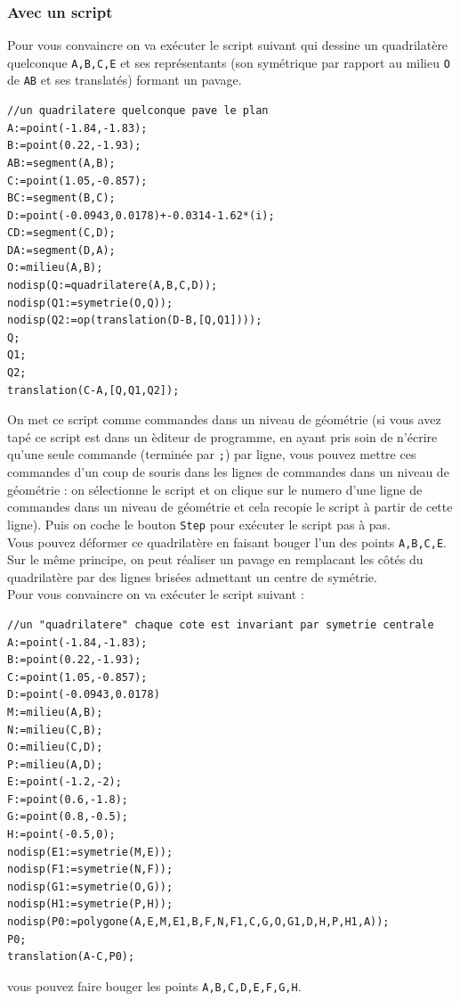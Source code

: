\documentclass[a4paper,11pt]{book}
\begin{document}
\subsubsection{Avec un script}
Pour vous convaincre on va ex\'ecuter le script suivant qui dessine un quadrilat\`ere quelconque {\tt A,B,C,E} et ses repr\'esentants 
 (son sym\'etrique par rapport au milieu {\tt O} de {\tt AB} et ses 
translat\'es) formant un pavage.\\ 
\begin{verbatim}
//un quadrilatere quelconque pave le plan
A:=point(-1.84,-1.83);
B:=point(0.22,-1.93);
AB:=segment(A,B);
C:=point(1.05,-0.857);
BC:=segment(B,C);
D:=point(-0.0943,0.0178)+-0.0314-1.62*(i);
CD:=segment(C,D);
DA:=segment(D,A);
O:=milieu(A,B);
nodisp(Q:=quadrilatere(A,B,C,D));
nodisp(Q1:=symetrie(O,Q));
nodisp(Q2:=op(translation(D-B,[Q,Q1])));
Q;
Q1;
Q2;
translation(C-A,[Q,Q1,Q2]);
\end{verbatim}
On met ce script comme commandes dans un niveau de g\'eom\'etrie (si vous avez 
tap\'e ce script est dans un \`editeur de programme, en ayant pris soin de 
n'\'ecrire qu'une seule commande (termin\'ee par {\tt ;}) par ligne, vous 
pouvez  mettre ces commandes d'un coup de souris dans les lignes de commandes 
dans un niveau de g\'eom\'etrie : on s\'electionne le script et on clique sur 
le numero d'une ligne de commandes dans un niveau de g\'eom\'etrie et cela 
recopie le script \`a partir de cette ligne). Puis on coche le bouton 
{\tt Step} pour ex\'ecuter le script pas \`a pas.\\
Vous pouvez d\'eformer ce quadrilat\`ere en faisant bouger 
l'un des points {\tt A,B,C,E}.\\

Sur le m\^eme principe, on peut r\'ealiser un pavage en remplacant les c\^ot\'es
du quadrilat\`ere par des lignes bris\'ees admettant un centre de sym\'etrie.\\
Pour vous convaincre on va ex\'ecuter le script suivant :
\begin{verbatim}
//un "quadrilatere" chaque cote est invariant par symetrie centrale
A:=point(-1.84,-1.83);
B:=point(0.22,-1.93);
C:=point(1.05,-0.857);
D:=point(-0.0943,0.0178)
M:=milieu(A,B);
N:=milieu(C,B);
O:=milieu(C,D);
P:=milieu(A,D);
E:=point(-1.2,-2);
F:=point(0.6,-1.8);
G:=point(0.8,-0.5);
H:=point(-0.5,0);
nodisp(E1:=symetrie(M,E));
nodisp(F1:=symetrie(N,F));
nodisp(G1:=symetrie(O,G));
nodisp(H1:=symetrie(P,H));
nodisp(P0:=polygone(A,E,M,E1,B,F,N,F1,C,G,O,G1,D,H,P,H1,A));
P0;
translation(A-C,P0);
\end{verbatim}  
vous pouvez faire bouger les points {\tt A,B,C,D,E,F,G,H}.\\
\end{document}
